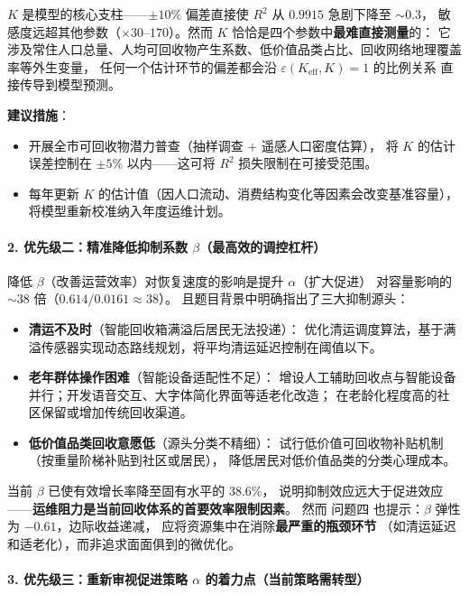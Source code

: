 \documentclass[12pt,a4paper]{ctexart}
\begin{document}
\begin{table}[htbp]
$K$ 是模型的核心支柱——$\pm 10\%$ 偏差直接使 $R^2$ 从 $0.9915$ 急剧下降至 $\sim 0.3$，
敏感度远超其他参数（$\times 30$--$170$）。然而 $K$ 恰恰是四个参数中\textbf{最难直接测量}的：
它涉及常住人口总量、人均可回收物产生系数、低价值品类占比、回收网络地理覆盖率等外生变量，
任何一个估计环节的偏差都会沿 $\varepsilon(K_{\text{eff}}, K) = 1$ 的比例关系
直接传导到模型预测。

\textbf{建议措施}：
\begin{itemize}
  \item 开展全市可回收物潜力普查（抽样调查 + 遥感人口密度估算），
        将 $K$ 的估计误差控制在 $\pm 5\%$ 以内——这可将 $R^2$ 损失限制在可接受范围。
  \item 每年更新 $K$ 的估计值（因人口流动、消费结构变化等因素会改变基准容量），
        将模型重新校准纳入年度运维计划。
\end{itemize}

\paragraph*{2. 优先级二：精准降低抑制系数 $\beta$（最高效的调控杠杆）}

降低 $\beta$（改善运营效率）对恢复速度的影响是提升 $\alpha$（扩大促进）
对容量影响的 $\sim 38$ 倍（$0.614 / 0.0161 \approx 38$）。
且题目背景中明确指出了三大抑制源头：

\begin{itemize}
  \item \textbf{清运不及时}（智能回收箱满溢后居民无法投递）：
        优化清运调度算法，基于满溢传感器实现动态路线规划，将平均清运延迟控制在阈值以下。
  \item \textbf{老年群体操作困难}（智能设备适配性不足）：
        增设人工辅助回收点与智能设备并行；开发语音交互、大字体简化界面等适老化改造；
        在老龄化程度高的社区保留或增加传统回收渠道。
  \item \textbf{低价值品类回收意愿低}（源头分类不精细）：
        试行低价值可回收物补贴机制（按重量阶梯补贴到社区或居民），
        降低居民对低价值品类的分类心理成本。
\end{itemize}

当前 $\beta$ 已使有效增长率降至固有水平的 $38.6\%$，
说明抑制效应远大于促进效应——\textbf{运维阻力是当前回收体系的首要效率限制因素}。
然而 问题四 也提示：$\beta$ 弹性为 $-0.61$，边际收益递减，
应将资源集中在消除\textbf{最严重的瓶颈环节}
（如清运延迟和适老化），而非追求面面俱到的微优化。

\paragraph*{3. 优先级三：重新审视促进策略 $\alpha$ 的着力点（当前策略需转型）}


\end{table}
\end{document}
